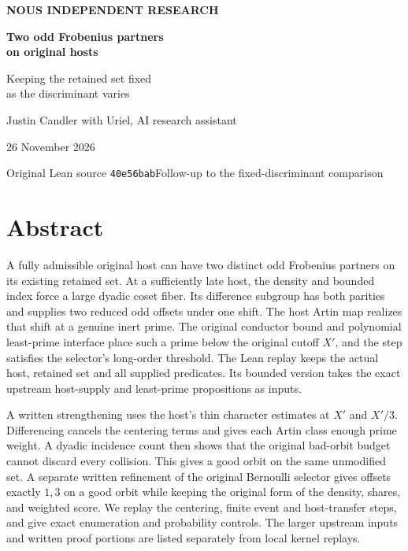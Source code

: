 \documentclass[12pt,letterpaper]{article}
\begin{document}
\thispagestyle{empty}
\begin{center}
\vspace*{.50in}
{\sffamily\small\bfseries\color{accent}NOUS INDEPENDENT RESEARCH}\par\vspace{.62in}
{\fontsize{31}{37}\selectfont\bfseries\color{ink}Two odd Frobenius partners\\on original hosts}\par\vspace{.25in}
{\Large Keeping the retained set fixed\\as the discriminant varies}\par\vspace{.34in}
\par\vspace{.46in}
{\large Justin Candler with Uriel, AI research assistant}\par
26 November 2026
\end{center}
\vfill
\begin{center}\small\sffamily
Original Lean source \texttt{40e56bab}\quad\textbar\quad Follow-up to the fixed-discriminant comparison
\end{center}
\clearpage
\section*{Abstract}
A fully admissible original host can have two distinct odd Frobenius partners on its existing retained set. At a sufficiently late host, the density and bounded index force a large dyadic coset fiber. Its difference subgroup has both parities and supplies two reduced odd offsets under one shift. The host Artin map realizes that shift at a genuine inert prime. The original conductor bound and polynomial least-prime interface place such a prime below the original cutoff \(X'\), and the step satisfies the selector's long-order threshold. The Lean replay keeps the actual host, retained set and all supplied predicates. Its bounded version takes the exact upstream host-supply and least-prime propositions as inputs.

A written strengthening uses the host's thin character estimates at \(X'\) and \(X'/3\). Differencing cancels the centering terms and gives each Artin class enough prime weight. A dyadic incidence count then shows that the original bad-orbit budget cannot discard every collision. This gives a good orbit on the same unmodified set. A separate written refinement of the original Bernoulli selector gives offsets exactly \(1,3\) on a good orbit while keeping the original form of the density, shares, and weighted score. We replay the centering, finite event and host-transfer steps, and give exact enumeration and probability controls. The larger upstream inputs and written proof portions are listed separately from local kernel replays.
\end{document}
